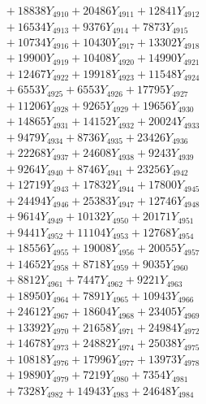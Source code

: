 \documentclass[a4paper,10pt]{article}
\begin{document}
{\begin{align}
&\;  + 18838 Y_{4910} + 20486 Y_{4911} + 12841 Y_{4912} \\[0.3ex]
&\;  + 16534 Y_{4913} + 9376 Y_{4914} + 7873 Y_{4915} \\[0.3ex]
&\;  + 10734 Y_{4916} + 10430 Y_{4917} + 13302 Y_{4918} \\[0.5ex]\allowbreak
&\;  + 19900 Y_{4919} + 10408 Y_{4920} + 14990 Y_{4921} \\[0.3ex]
&\;  + 12467 Y_{4922} + 19918 Y_{4923} + 11548 Y_{4924} \\[0.3ex]
&\;  + 6553 Y_{4925} + 6553 Y_{4926} + 17795 Y_{4927} \\[0.3ex]
&\;  + 11206 Y_{4928} + 9265 Y_{4929} + 19656 Y_{4930} \\[0.3ex]
&\;  + 14865 Y_{4931} + 14152 Y_{4932} + 20024 Y_{4933} \\[0.3ex]
&\;  + 9479 Y_{4934} + 8736 Y_{4935} + 23426 Y_{4936} \\[0.3ex]
&\;  + 22268 Y_{4937} + 24608 Y_{4938} + 9243 Y_{4939} \\[0.3ex]
&\;  + 9264 Y_{4940} + 8746 Y_{4941} + 23256 Y_{4942} \\[0.3ex]
&\;  + 12719 Y_{4943} + 17832 Y_{4944} + 17800 Y_{4945} \\[0.3ex]
&\;  + 24494 Y_{4946} + 25383 Y_{4947} + 12746 Y_{4948} \\[0.5ex]\allowbreak
&\;  + 9614 Y_{4949} + 10132 Y_{4950} + 20171 Y_{4951} \\[0.3ex]
&\;  + 9441 Y_{4952} + 11104 Y_{4953} + 12768 Y_{4954} \\[0.3ex]
&\;  + 18556 Y_{4955} + 19008 Y_{4956} + 20055 Y_{4957} \\[0.3ex]
&\;  + 14652 Y_{4958} + 8718 Y_{4959} + 9035 Y_{4960} \\[0.3ex]
&\;  + 8812 Y_{4961} + 7447 Y_{4962} + 9221 Y_{4963} \\[0.3ex]
&\;  + 18950 Y_{4964} + 7891 Y_{4965} + 10943 Y_{4966} \\[0.3ex]
&\;  + 24612 Y_{4967} + 18604 Y_{4968} + 23405 Y_{4969} \\[0.3ex]
&\;  + 13392 Y_{4970} + 21658 Y_{4971} + 24984 Y_{4972} \\[0.3ex]
&\;  + 14678 Y_{4973} + 24882 Y_{4974} + 25038 Y_{4975} \\[0.3ex]
&\;  + 10818 Y_{4976} + 17996 Y_{4977} + 13973 Y_{4978} \\[0.5ex]\allowbreak
&\;  + 19890 Y_{4979} + 7219 Y_{4980} + 7354 Y_{4981} \\[0.3ex]
&\;  + 7328 Y_{4982} + 14943 Y_{4983} + 24648 Y_{4984} \\[0.3ex]

\end{align}}
\end{document}
